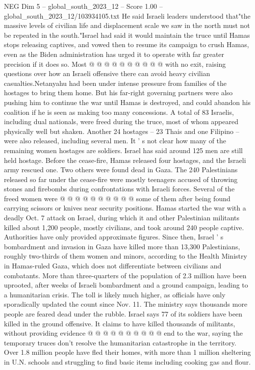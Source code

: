 \begin{textsample}{NEG Dim 5 – global\_south\_2023\_12 – Score 1.00 – global\_south\_2023\_12/103934105.txt}
He said Israeli leaders understood that"the massive levels of civilian life and displacement scale we saw in the north must not be repeated in the south."Israel had said it would maintain the truce until Hamas stops releasing captives, and vowed then to resume its campaign to crush Hamas, even as the Biden administration has urged it to operate with far greater precision if it does so.
Most @ @ @ @ @ @ @ @ @ @ with no exit, raising questions over how an Israeli offensive there can avoid heavy civilian casualties.Netanyahu had been under intense pressure from families of the hostages to bring them home.
But his far-right governing partners were also pushing him to continue the war until Hamas is destroyed, and could abandon his coalition if he is seen as making too many concessions.
A total of 83 Israelis, including dual nationals, were freed during the truce, most of whom appeared physically well but shaken.
Another 24 hostages -- 23 Thais and one Filipino -- were also released, including several men.
It ' s not clear how many of the remaining women hostages are soldiers.
Israel has said around 125 men are still held hostage.
Before the cease-fire, Hamas released four hostages, and the Israeli army rescued one.
Two others were found dead in Gaza.
The 240 Palestinians released so far under the cease-fire were mostly teenagers accused of throwing stones and firebombs during confrontations with Israeli forces.
Several of the freed women were @ @ @ @ @ @ @ @ @ @ some of them after being found carrying scissors or knives near security positions.
Hamas started the war with a deadly Oct. 7 attack on Israel, during which it and other Palestinian militants killed about 1,200 people, mostly civilians, and took around 240 people captive.
Authorities have only provided approximate figures.
Since then, Israel ' s bombardment and invasion in Gaza have killed more than 13,300 Palestinians, roughly two-thirds of them women and minors, according to the Health Ministry in Hamas-ruled Gaza, which does not differentiate between civilians and combatants.
More than three-quarters of the population of 2.3 million have been uprooted, after weeks of Israeli bombardment and a ground campaign, leading to a humanitarian crisis.
The toll is likely much higher, as officials have only sporadically updated the count since Nov. 11.
The ministry says thousands more people are feared dead under the rubble.
Israel says 77 of its soldiers have been killed in the ground offensive.
It claims to have killed thousands of militants, without providing evidence @ @ @ @ @ @ @ @ @ @ end to the war, saying the temporary truces don't resolve the humanitarian catastrophe in the territory.
Over 1.8 million people have fled their homes, with more than 1 million sheltering in U.N. schools and struggling to find basic items including cooking gas and flour.

\end{textsample}
